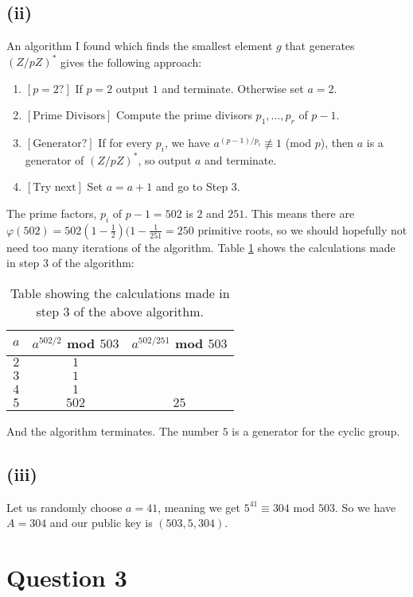 \documentclass[a4paper, fleqn]{article}
\begin{document}
\subsection{(ii)}
An algorithm \cite[Algorithm 2.5.16]{wstein} I found which finds the smallest element $g$ that generates $(Z/pZ)^*$ gives the following approach:
\begin{enumerate}
  \item  $[p = 2?]$ If $p=2$ output $1$ and terminate. Otherwise set $a=2$.
  \item  $[\mbox{Prime Divisors}]$ Compute the prime divisors $p_1,\ldots, p_r$ of $p-1$.
  \item  $[\mbox{Generator?}]$ If for every $p_i$, we have $a^{(p-1)/p_i} \not\equiv 1$ (mod $p$), then $a$ is a generator of $(Z/pZ)^*$, so output $a$ and terminate.
  \item  $[\mbox{Try next}]$ Set $a=a+1$ and go to Step 3.
\end{enumerate}
The prime factors, $p_i$ of $p-1=502$ is $2$ and $251$. This means there are $\varphi(502)=502(1-\frac{1}{2})(1-\frac{1}{251}=250$ primitive roots, so we should hopefully not need too many iterations of the algorithm. Table \ref{tab1} shows the calculations made in step $3$ of the algorithm:
\begin{table}[H]
  \centering
  \begin{tabular}{|c|c|c|}
  \hline
  $a$ & $a^{502/2}$ mod $503$ & $a^{502/251}$ mod $503$ \\
  \hline
  $2$ & $1$ & \\
  \hline
  $3$ & $1$ & \\
  \hline
  $4$ & $1$ & \\
  \hline
  $5$ & $502$ & $25$ \\
  \hline
  \end{tabular}
  \caption{Table showing the calculations made in step $3$ of the above algorithm.}
  \label{tab1}
\end{table}
And the algorithm terminates. The number $5$ is a generator for the cyclic group.

\subsection{(iii)}
Let us randomly choose $a=41$, meaning we get $5^{41} \equiv 304$ mod $503$. So we have $A=304$ and our public key is $(503, 5, 304)$.

\section{Question 3}
\end{document}
